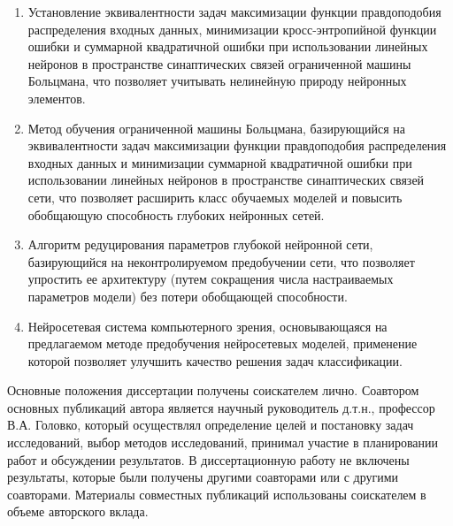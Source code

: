 \begin{enumerate}[wide, labelindent=10mm]
	\item Установление эквивалентности задач максимизации функции правдоподобия распределения входных данных, минимизации кросс-энтропийной функции ошибки и суммарной квадратичной ошибки при использовании линейных нейронов в пространстве синаптических связей ограниченной машины Больцмана, что позволяет учитывать нелинейную природу нейронных элементов.
	\item Метод обучения ограниченной машины Больцмана, базирующийся на эквивалентности задач максимизации функции правдоподобия распределения входных данных и минимизации суммарной квадратичной ошибки при использовании линейных нейронов в пространстве синаптических связей сети, что позволяет расширить класс обучаемых моделей и повысить обобщающую способность глубоких нейронных сетей.
	\item Алгоритм редуцирования параметров глубокой нейронной сети, базирующийся на неконтролируемом предобучении сети, что позволяет упростить ее архитектуру (путем сокращения числа настраиваемых параметров модели) без потери обобщающей способности.
	\item Нейросетевая система компьютерного зрения, основывающаяся на предлагаемом методе предобучения нейросетевых моделей, применение которой позволяет улучшить качество решения задач классификации. 
\end{enumerate}

\vspace{3mm}
\contribution
\vspace{3mm}

Основные положения диссертации получены соискателем лично. Соавтором основных публикаций автора является научный руководитель д.т.н., профессор В.А. Головко, который осуществлял определение целей и постановку задач исследований, выбор методов исследований, принимал участие в планировании работ и обсуждении результатов. В диссертационную работу не включены результаты, которые были получены другими соавторами или с другими соавторами. Материалы совместных публикаций использованы соискателем в объеме авторского вклада.

\vspace{3mm}
\probation
\vspace{3mm}

